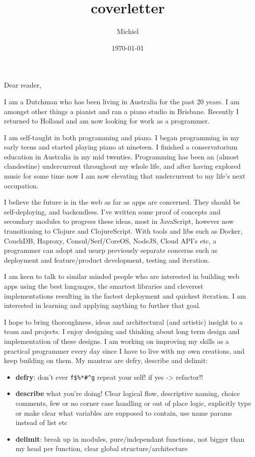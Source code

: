 \documentclass[11pt]{article}
\author{Michiel}
\date{\today}
\title{coverletter}
\begin{document}
\maketitle
\tableofcontents

Dear reader,

I am a Dutchman who has been living in Australia for the past 20 years. I am
amongst other things a pianist and ran a piano studio in Brisbane. Recently I
returned to Holland and am now looking for work as a programmer.

I am self-taught in both programming and piano. I began programming in my early teens and started playing piano at nineteen. I finished a conservatorium education in Australia in my mid twenties. Programming has been an (almost clandestine) undercurrent throughout my whole life, and after having explored music for some time now I am now elevating that undercurrent to my life's next occupation. 

I believe the future is in the web as far as apps are concerned. They should be
self-deploying, and backendless. I've written some proof of concepts and
secondary modules to progress these ideas, most in JavaScript, however now
transitioning to Clojure and ClojureScript. With tools and libs such as Docker,
CouchDB, Haproxy, Consul/Serf/CoreOS, NodeJS, Cloud API's etc, a programmer can
adopt and usurp previously separate concerns such as deployment and
feature/product development, testing and iteration.

I am keen to talk to similar minded people who are interested in building web apps using the best languages, the smartest libraries and cleverest implementations resulting in the fastest deployment and quickest iteration. I am interested in learning and applying anything to further that goal. 

I hope to bring thoroughness, ideas and architectural (and artistic) insight to a team and projects. I enjoy designing and thinking about long term design and implementation of these designs. I am working on improving my skills as a practical programmer every day since I have to live with my own creations, and keep building on them. My mantras are defry, describe and delimit:
\vspace{3mm} %
\renewcommand{\labelitemi}{\textbullet}

\begin{itemize}
\item \textbf{defry}: don't ever \verb~f$%*#^g~ repeat your self!
if yes -> refactor!!
\item \textbf{describe} what you're doing!
Clear logical flow, descriptive naming, choice comments, few or no corner case handling or out of place logic, explicitly type or make clear what variables are supposed to contain, use name params instead of list etc
\item \textbf{delimit}: break up in modules, pure/independant functions, not bigger than my head per function, clear global structure/architecture
\end{itemize}
\end{document}
